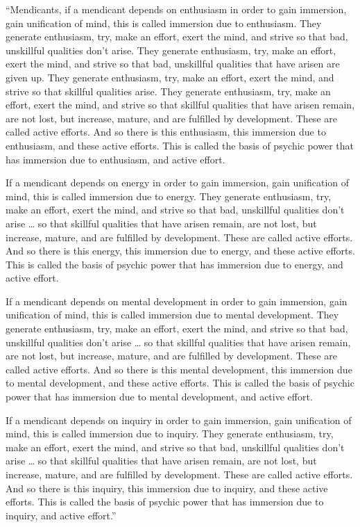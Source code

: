 \documentclass[12pt,openany]{book}%
\begin{document}
“Mendicants, if a mendicant depends on enthusiasm in order to gain immersion, gain unification of mind, this is called immersion due to enthusiasm. They generate enthusiasm, try, make an effort, exert the mind, and strive so that bad, unskillful qualities don’t arise. They generate enthusiasm, try, make an effort, exert the mind, and strive so that bad, unskillful qualities that have arisen are given up. They generate enthusiasm, try, make an effort, exert the mind, and strive so that skillful qualities arise. They generate enthusiasm, try, make an effort, exert the mind, and strive so that skillful qualities that have arisen remain, are not lost, but increase, mature, and are fulfilled by development. These are called active efforts. And so there is this enthusiasm, this immersion due to enthusiasm, and these active efforts. This is called the basis of psychic power that has immersion due to enthusiasm, and active effort. 

If a mendicant depends on energy in order to gain immersion, gain unification of mind, this is called immersion due to energy. They generate enthusiasm, try, make an effort, exert the mind, and strive so that bad, unskillful qualities don’t arise … so that skillful qualities that have arisen remain, are not lost, but increase, mature, and are fulfilled by development. These are called active efforts. And so there is this energy, this immersion due to energy, and these active efforts. This is called the basis of psychic power that has immersion due to energy, and active effort. 

If a mendicant depends on mental development in order to gain immersion, gain unification of mind, this is called immersion due to mental development. They generate enthusiasm, try, make an effort, exert the mind, and strive so that bad, unskillful qualities don’t arise … so that skillful qualities that have arisen remain, are not lost, but increase, mature, and are fulfilled by development. These are called active efforts. And so there is this mental development, this immersion due to mental development, and these active efforts. This is called the basis of psychic power that has immersion due to mental development, and active effort. 

If a mendicant depends on inquiry in order to gain immersion, gain unification of mind, this is called immersion due to inquiry. They generate enthusiasm, try, make an effort, exert the mind, and strive so that bad, unskillful qualities don’t arise … so that skillful qualities that have arisen remain, are not lost, but increase, mature, and are fulfilled by development. These are called active efforts. And so there is this inquiry, this immersion due to inquiry, and these active efforts. This is called the basis of psychic power that has immersion due to inquiry, and active effort.” 
\end{document}
